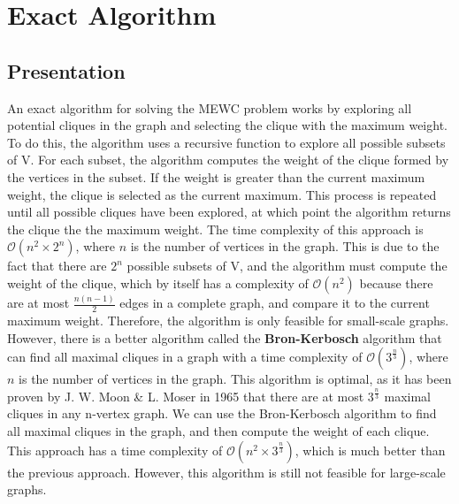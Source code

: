 
\section{Exact Algorithm}


\subsection{Presentation}

An exact algorithm for solving the MEWC problem works by exploring all potential
cliques in the graph and selecting the clique with the maximum weight. To do this,
the algorithm uses a recursive function to explore all possible subsets of V.
For each subset, the algorithm computes the weight of the clique formed by the
vertices in the subset. If the weight is greater than the current maximum weight,
the clique is selected as the current maximum. This process is repeated until all
possible cliques have been explored, at which point the algorithm returns the
clique the the maximum weight.
\newline \newline
The time complexity of this approach is $\mathcal{O}(n^2\times2^n)$, where $n$ 
is the number of vertices in the graph. This is due to the fact that there are 
$2^n$ possible subsets of V, and the algorithm must compute the weight of the clique, 
which by itself has a complexity of $\mathcal{O}(n^2)$ because there are at most
$\frac{n(n-1)}{2}$ edges in a complete graph, and compare it to the current 
maximum weight. Therefore, the algorithm is only feasible for small-scale graphs.
\newline \newline
However, there is a better algorithm called the \textbf{Bron-Kerbosch}
algorithm\cite{finding-all-cliques-of-an-undirected-graph} that can find all 
maximal cliques in a graph with a time complexity of $\mathcal{O}(3^{\frac{n}{3}})$, 
where $n$ is the number of vertices in the graph. 
This algorithm is optimal, as it has been proven by J. W. Moon \& L. Moser in 
1965\cite{on-cliques-in-graphs} that there are at most $3^{\frac{n}{3}}$ maximal 
cliques in any n-vertex graph.
\newline \newline
We can use the Bron-Kerbosch algorithm to find all maximal cliques in the graph,
and then compute the weight of each clique. This approach has a time complexity of
$\mathcal{O}(n^2\times3^{\frac{n}{3}})$, which is much better than the previous
approach. However, this algorithm is still not feasible for large-scale graphs.


